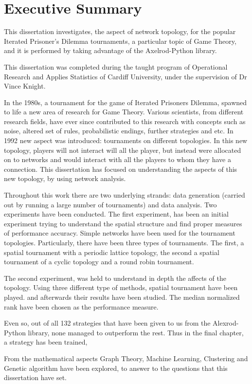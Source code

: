 \chapter{Executive Summary}
This dissertation investigates, the aspect of network topology, for the popular
Iterated Prisoner's Dilemma tournaments, a particular topic of  Game
Theory, and it is performed by taking advantage of the Axelrod-Python library.

This dissertation was completed during the taught program of Operational Research
and Applies Statistics of Cardiff University, under the supervision of Dr Vince
Knight.

In the 1980s, a tournament for the game of Iterated Prisoners Dilemma, spawned to
life a new area of research for Game Theory. Various scientists, from different
research fields, have ever since contributed to this research with concepts
such as noise, altered set of rules, probabilistic endings, further strategies and etc.
In 1992 new aspect was introduced: tournaments on different topologies.
In this new topology, players will not interact will all the player, but instead
were allocated on to networks and would interact with all the players to whom they have a
connection. This dissertation has focused on understanding the aspects of
this new topology, by using network analysis.

Throughout this work there are two underlying strands: data generation (carried
out by running a large number of tournaments) and data analysis.
Two experiments have been conducted. The first experiment, has been an initial
experiment trying to understand the spatial structure and find proper measures
of performance accuracy. Simple networks have been used for the tournament
topologies. Particularly, there have been three types of tournaments.
The first, a spatial tournament with a periodic lattice topology, the
second a spatial tournament of a cyclic topology and a round robin tournament.

The second experiment, was held to understand in depth the affects of the
topology. Using three different type of methods, spatial tournament have been
played. and afterwards their results have been studied. The median normalized
rank have been chosen as the performance measure.

Even so, out of all 132 strategies that have been given to us from the Alexrod-Python
library, none managed to outperform the rest. Thus in the final chapter, a
strategy has been trained,

From the mathematical aspects Graph Theory, Machine Learning, Clustering and
Genetic algorithm have been explored, to answer to the questions that this
dissertation have set.
